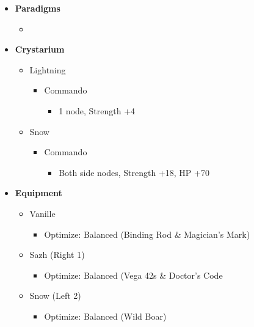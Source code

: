 \documentclass{report}
\begin{document}
\begin{menu}
\begin{itemize}
    \item \textbf{Paradigms}
    \begin{itemize}
        \item {}%
{\paradigmline{(\rav)}{\rav}{\rav}}%
{\paradigmline{\com}{\sen}{\med}}%
{\paradigmline{\textit{[\com]}}{\textit{\com}}{\textit{\rav}}}%
{\paradigmline{[\com]}{\com}{\rav}}
    \end{itemize}
    \item \textbf{Crystarium}
    \begin{itemize}
        \item Lightning
        \begin{itemize}
            \item Commando
            \begin{itemize}
                \item 1 node, Strength +4
            \end{itemize}
        \end{itemize}
        \item Snow
        \begin{itemize}
            \item Commando
            \begin{itemize}
                \item Both side nodes, Strength +18, HP +70
            \end{itemize}
        \end{itemize}
    \end{itemize}
    
    \item \textbf{Equipment}
    \begin{itemize}
        \item Vanille
        \begin{itemize}
            \item Optimize: Balanced (Binding Rod \& Magician's Mark)
        \end{itemize}
        \item Sazh (Right 1)
        \begin{itemize}
            \item Optimize: Balanced (Vega 42s \& Doctor's Code
        \end{itemize}
        \item Snow (Left 2)
        \begin{itemize}
            \item Optimize: Balanced (Wild Boar)
        \end{itemize}
    \end{itemize}
\end{itemize}
\end{menu}
\end{document}
